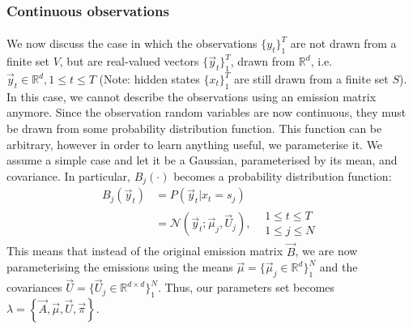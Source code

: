 \subsubsection{Continuous observations}

\paragraph{}
	We now discuss the case in which the observations $\{y_t\}_1^T$ are not drawn from a finite set $V$, but are real-valued vectors $\{\vec y_t\}_1^T$, drawn from $\mathbb{R}^d$, i.e. $\vec y_t \in \mathbb{R}^d, 1 \leq t \leq T$ (Note: hidden states $\{x_t\}_1^T$ are still drawn from a finite set $S$). In this case, we cannot describe the observations using an emission matrix anymore. Since the observation random variables are now continuous, they must be drawn from some probability distribution function. This function can be arbitrary, however in order to learn anything useful, we parameterise it. We assume a simple case and let it be a Gaussian, parameterised by its mean, and covariance. In particular, $B_j(\cdot)$ becomes a probability distribution function:
	\begin{align}
		B_j(\vec y_t) 	& = P\left( \vec y_t | x_t = s_j\right) \nonumber\\
					& = \mathcal{N}(\vec y_t; \vec\mu_j, \vec U_j), \label{eqn:gaussian}&
		\begin{array}{lr}
			1 \leq t \leq T\\
			1 \leq j \leq N
		\end{array}
	\end{align}
This means that instead of the original emission matrix $\vec B$, we are now parameterising the emissions using the means $\vec\mu = \{\vec\mu_j \in \mathbb{R}^d\}_1^N$ and the covariances $\vec U = \{\vec U_j \in \mathbb{R}^{d\times d}\}_1^N$. Thus, our parameters set becomes $\lambda = \left\{ \vec A, \vec \mu, \vec U, \vec \pi\right\}$.

